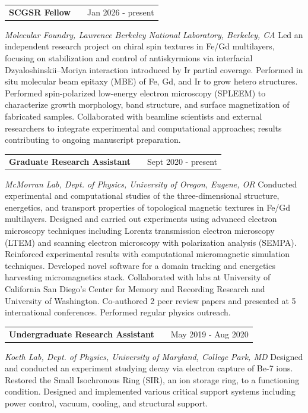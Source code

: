 \documentclass[a4paper,12pt]{article}
\makeatletter
\newenvironment{jobshort}[2]
    {
    \begin{tabularx}{\linewidth}{@{}l X r@{}}
    \textbf{#1} & \hfill &  #2 \\[3.75pt]
    \end{tabularx}
    }
    {
    }
\makeatother
\begin{document}
\begin{jobshort}{SCGSR Fellow}{Jan 2026 - present}
\textit{Molecular Foundry, Lawrence Berkeley National Laboratory, Berkeley, CA} \newline
Led an independent research project on chiral spin textures in Fe/Gd multilayers, focusing on stabilization and control of antiskyrmions via interfacial Dzyaloshinskii–Moriya interaction introduced by Ir partial coverage. Performed in situ molecular beam epitaxy (MBE) of Fe, Gd, and Ir to grow hetero structures. Performed spin-polarized low-energy electron microscopy (SPLEEM) to characterize growth morphology, band structure, and surface magnetization of fabricated samples. Collaborated with beamline scientists and external researchers to integrate experimental and computational approaches; results contributing to ongoing manuscript preparation.
\end{jobshort}

\begin{jobshort}{Graduate Research Assistant}{Sept 2020 - present}
\textit{McMorran Lab, Dept. of Physics, University of Oregon, Eugene, OR} \newline
Conducted experimental and computational studies of the three-dimensional structure, energetics, and transport properties of topological magnetic textures in Fe/Gd multilayers. Designed and carried out experiments using advanced electron microscopy techniques including Lorentz transmission electron microscopy (LTEM) and scanning electron microscopy with polarization analysis (SEMPA). Reinforced experimental results with computational micromagnetic simulation techniques. Developed novel software for a domain tracking and energetics harvesting micromagnetics stack. Collaborated with labs at University of California San Diego’s Center for Memory and Recording Research and University of Washington. Co-authored 2 peer review papers and presented at 5 international conferences. Performed regular physics outreach.
\end{jobshort}

\begin{jobshort}{Undergraduate Research Assistant}{May 2019 - Aug 2020}
\textit{Koeth Lab, Dept. of Physics, University of Maryland, College Park, MD} \newline
Designed and conducted an experiment studying decay via electron capture of Be-7 ions. Restored the Small Isochronous Ring (SIR), an ion storage ring, to a functioning condition. Designed and implemented various critical support systems including power control, vacuum, cooling, and structural support.
\end{jobshort}
\end{document}

